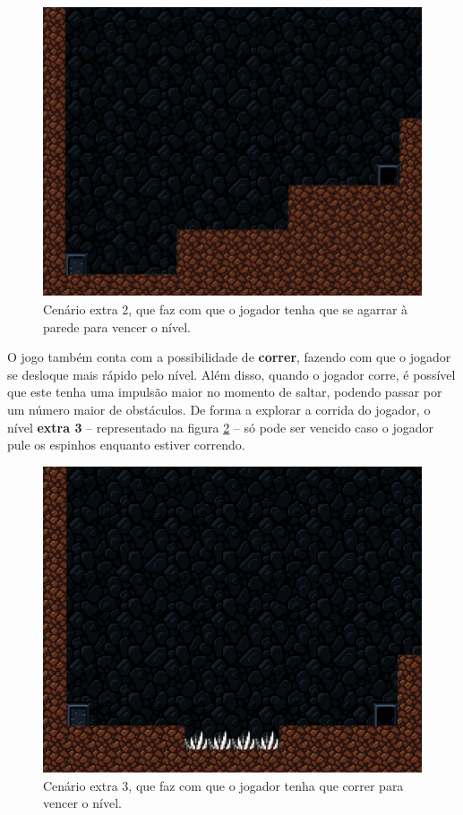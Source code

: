 \begin{figure}[H]
\centering
\includegraphics[width=\textwidth / 2]{fig/levels/extra2.pdf}
\caption{Cenário extra 2, que faz com que o jogador tenha que se agarrar à
    parede para vencer o nível.}
\label{fig:extra2}
\end{figure}

O jogo também conta com a possibilidade de \textbf{correr}, fazendo com que o
jogador se desloque mais rápido pelo nível. Além disso, quando o jogador corre,
é possível que este tenha uma impulsão maior no momento de saltar, podendo
passar por um número maior de obstáculos. De forma a explorar a corrida do
jogador, o nível \textbf{extra 3} -- representado na figura \ref{fig:extra3} --
só pode ser vencido caso o jogador pule os espinhos enquanto estiver correndo.

\begin{figure}[H]
\centering
\includegraphics[width=\textwidth / 2]{fig/levels/extra3.pdf}
\caption{Cenário extra 3, que faz com que o jogador tenha que correr para
    vencer o nível.}
\label{fig:extra3}
\end{figure}

